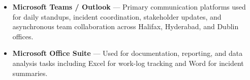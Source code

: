 \begin{itemize}

    \item \textbf{Microsoft Teams / Outlook} --- Primary communication
          platforms used for daily standups, incident coordination,
          stakeholder updates, and asynchronous team collaboration
          across Halifax, Hyderabad, and Dublin offices.

    \item \textbf{Microsoft Office Suite} --- Used for documentation,
          reporting, and data analysis tasks including Excel for
          work-log tracking and Word for incident summaries.

\end{itemize}
